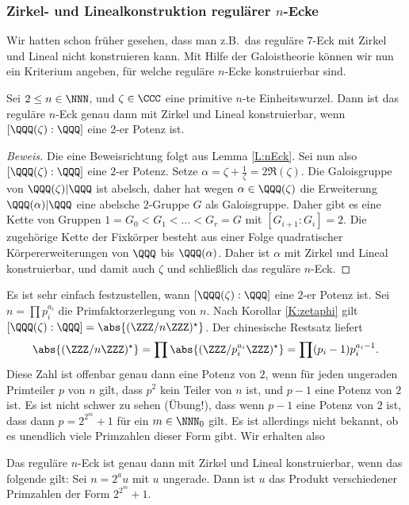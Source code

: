 \documentclass[12pt,a4paper,twoside]{article}
\begin{document}
\subsubsection{Zirkel- und Linealkonstruktion regul\"arer $n$-Ecke}
Wir hatten schon fr\"uher gesehen, dass man z.B.\ das regul\"are $7$-Eck mit
Zirkel und Lineal nicht konstruieren kann. Mit Hilfe der Galoistheorie
k\"onnen wir nun ein Kriterium angeben, f\"ur welche regul\"are $n$-Ecke
konstruierbar sind.
\begin{Lemma}
  Sei $2\le n\in\NNN$, und $\zeta\in\CCC$ eine primitive $n$-te
  Einheitswurzel. Dann ist das regul\"are $n$-Eck genau dann mit Zirkel und
  Lineal konstruierbar, wenn $[\QQQ(\zeta):\QQQ]$ eine $2$-er Potenz ist.
\end{Lemma}
\begin{proof}[Beweis]
  Die eine Beweisrichtung folgt aus Lemma \ref{L:nEck}. Sei nun also
  $[\QQQ(\zeta):\QQQ]$ eine $2$-er Potenz. Setze
  $\alpha=\zeta+\frac{1}{\zeta}=2\Re(\zeta)$. Die Galoisgruppe von
  $\QQQ(\zeta)|\QQQ$ ist abelsch, daher hat wegen $\alpha\in\QQQ(\zeta)$ die
  Erweiterung $\QQQ(\alpha)|\QQQ$ eine abelsche $2$-Gruppe $G$ als
  Galoisgruppe. Daher gibt es eine Kette von Gruppen $1=G_0<G_1<\dots<G_r=G$
  mit $[G_{i+1}:G_i]=2$. Die zugeh\"orige Kette der Fixk\"orper besteht aus
  einer Folge quadratischer K\"orpererweiterungen von $\QQQ$ bis
  $\QQQ(\alpha)$. Daher ist $\alpha$ mit Zirkel und Lineal konstruierbar, und
  damit auch $\zeta$ und schlie\ss lich das regul\"are $n$-Eck.
\end{proof}
Es ist sehr einfach festzustellen, wann $[\QQQ(\zeta):\QQQ]$ eine $2$-er
Potenz ist. Sei $n=\prod p_i^{a_i}$ die Primfaktorzerlegung von $n$. 
Nach Korollar \ref{K:zetaphi} gilt
$[\QQQ(\zeta):\QQQ]=\abs{(\ZZZ/n\ZZZ)^\star}$. Der chinesische Restsatz
liefert
\[
\abs{(\ZZZ/n\ZZZ)^\star}=\prod\abs{(\ZZZ/p_i^{a_i}\ZZZ)^\star}=
  \prod(p_i-1)p_i^{a_i-1}.
\]
Diese Zahl ist offenbar genau dann eine Potenz von $2$, wenn f\"ur jeden
ungeraden Primteiler $p$ von $n$ gilt, dass $p^2$ kein Teiler von $n$ ist, und
$p-1$ eine Potenz von $2$ ist. Es ist nicht schwer zu sehen (\"Ubung!), dass
wenn $p-1$ eine Potenz von $2$ ist, dass dann $p=2^{2^m}+1$ f\"ur ein
$m\in\NNN_0$ gilt. Es ist allerdings nicht bekannt, ob es unendlich viele
Primzahlen dieser Form gibt. Wir erhalten also
\begin{Satz}
  Das regul\"are $n$-Eck ist genau dann mit Zirkel und Lineal konstruierbar,
  wenn das folgende gilt: Sei $n=2^au$ mit $u$ ungerade. Dann ist $u$ das
  Produkt verschiedener Primzahlen der Form $2^{2^m}+1$.
\end{Satz}
\end{document}
